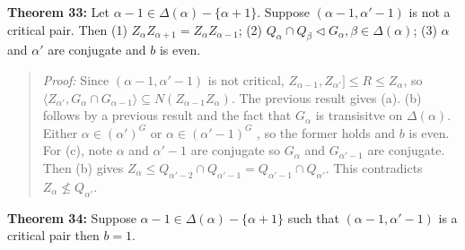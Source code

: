 {\bf Theorem 33:}
Let $\alpha - 1 \in \Delta(\alpha) - \{ \alpha+1 \}$.  Suppose $(\alpha-1, \alpha'-1)$ is not a critical pair.
Then
(1) $ Z_{\alpha} Z_{\alpha+1} = Z_{\alpha} Z_{\alpha-1} $;
(2) $Q_{\alpha} \cap Q_{\beta} \lhd G_{\alpha}, \beta \in \Delta( \alpha)$;
(3) $\alpha$ and
$\alpha'$ are conjugate and $b$ is even.
\begin{quote}
\emph{Proof:}   Since $(\alpha-1, \alpha'-1)$ is not critical, $Z_{\alpha-1}, Z_{\alpha'}] \leq R \leq Z_{\alpha}$,
so $\langle Z_{\alpha'}, G_{\alpha} \cap G_{\alpha-1} \rangle \subseteq N(Z_{\alpha-1}Z_{\alpha})$.  The previous result
gives (a). (b) follows by a previous result and the fact that $G_{\alpha}$ is transisitve on $\Delta( \alpha )$.
Either 
$\alpha \in (\alpha')^G$ or
$\alpha \in (\alpha'-1)^G$ , so the former holds and $b$ is even.
For (c), note $\alpha$ and $\alpha'-1$ are conjugate so
$G_{\alpha}$ and $G_{\alpha'-1}$ are conjugate.  Then (b) gives $Z_{\alpha} \leq
Q_{\alpha'-2} \cap Q_{\alpha'-1} =
Q_{\alpha'-1} \cap Q_{\alpha'} $.  This contradicts $Z_{\alpha} \nleq Q_{\alpha'}$.
\end{quote}
{\bf Theorem 34:}
Suppose $\alpha - 1 \in \Delta(\alpha) - \{ \alpha+1 \}$ such that  $(\alpha-1, \alpha'-1)$ is a critical pair
then $b=1$.
